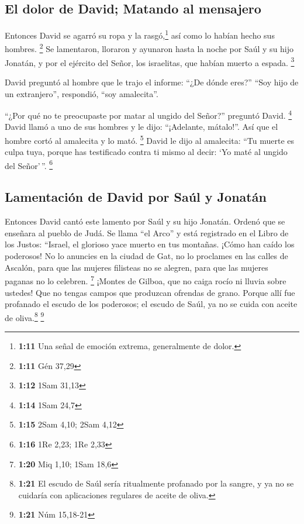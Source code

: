 \hypertarget{el-dolor-de-david-matando-al-mensajero}{%
\subsection{El dolor de David; Matando al
mensajero}\label{el-dolor-de-david-matando-al-mensajero}}

 Entonces David se agarró su ropa y la rasgó,\footnote{\textbf{1:11}
  Una señal de emoción extrema, generalmente de dolor.} así como lo
habían hecho sus hombres. \footnote{\textbf{1:11} Gén 37,29}
 Se lamentaron, lloraron y ayunaron hasta la noche por
Saúl y su hijo Jonatán, y por el ejército del Señor, los israelitas, que
habían muerto a espada. \footnote{\textbf{1:12} 1Sam 31,13}

 David preguntó al hombre que le trajo el informe: ``¿De
dónde eres?'' ``Soy hijo de un extranjero'', respondió, ``soy
amalecita''.

 ``¿Por qué no te preocupaste por matar al ungido del
Señor?'' preguntó David. \footnote{\textbf{1:14} 1Sam 24,7}
 David llamó a uno de sus hombres y le dijo: ``¡Adelante,
mátalo!''. Así que el hombre cortó al amalecita y lo mató. \footnote{\textbf{1:15}
  2Sam 4,10; 2Sam 4,12}  David le dijo al amalecita: ``Tu
muerte es culpa tuya, porque has testificado contra ti mismo al decir:
`Yo maté al ungido del Señor'\,''. \footnote{\textbf{1:16} 1Re 2,23; 1Re
  2,33}

\hypertarget{lamentaciuxf3n-de-david-por-sauxfal-y-jonatuxe1n}{%
\subsection{Lamentación de David por Saúl y
Jonatán}\label{lamentaciuxf3n-de-david-por-sauxfal-y-jonatuxe1n}}

 Entonces David cantó este lamento por Saúl y su hijo
Jonatán.  Ordenó que se enseñara al pueblo de Judá. Se
llama ``el Arco'' y está registrado en el Libro de los Justos:
 ``Israel, el glorioso yace muerto en tus montañas. ¡Cómo
han caído los poderosos!  No lo anuncies en la ciudad de
Gat, no lo proclames en las calles de Ascalón, para que las mujeres
filisteas no se alegren, para que las mujeres paganas no lo celebren.
\footnote{\textbf{1:20} Miq 1,10; 1Sam 18,6}  ¡Montes de
Gilboa, que no caiga rocío ni lluvia sobre ustedes! Que no tengas campos
que produzcan ofrendas de grano. Porque allí fue profanado el escudo de
los poderosos; el escudo de Saúl, ya no se cuida con aceite de
oliva.\footnote{\textbf{1:21} El escudo de Saúl sería ritualmente
  profanado por la sangre, y ya no se cuidaría con aplicaciones
  regulares de aceite de oliva.} \footnote{\textbf{1:21} Núm 15,18-21}

